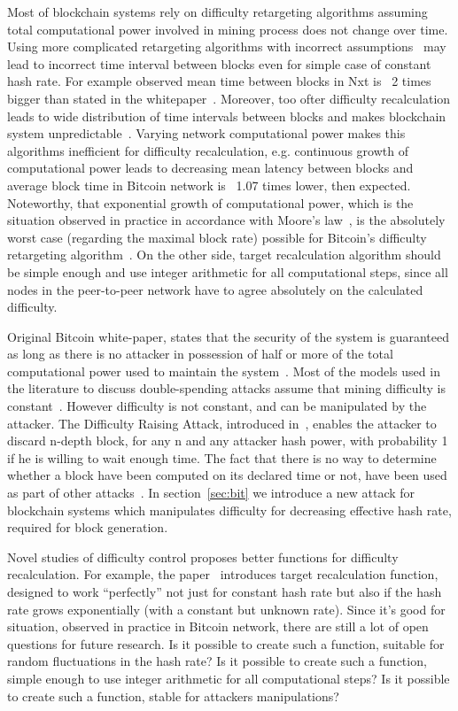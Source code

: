 \documentclass[number,preprint,review]{elsarticle}
\begin{document}
Most of blockchain systems rely on difficulty retargeting algorithms assuming total computational power involved in mining process does not change over time.
Using more complicated retargeting algorithms with incorrect assumptions~\cite{andruiman2014} may lead to incorrect time interval between blocks even for simple case of constant hash rate. For example observed mean time between blocks in Nxt is ~2 times bigger than stated in the whitepaper~\cite{nxt}. Moreover, too ofter difficulty recalculation leads to wide distribution of time intervals between blocks and makes blockchain system unpredictable~\cite{andruiman2014}.
Varying network computational power makes this algorithms inefficient for difficulty recalculation, e.g. continuous growth of computational power leads to decreasing mean latency between blocks and average block time in Bitcoin network is ~1.07 times lower, then expected.
Noteworthy, that exponential growth of computational power, which is the situation observed in practice in accordance with Moore’s law~\cite{moore2006cramming}, is the absolutely worst case (regarding the maximal block rate) possible for Bitcoin’s difficulty retargeting algorithm~\cite{kraft2015difficulty}.
On the other side, target recalculation algorithm should be simple enough and use integer arithmetic for all computational steps, since all nodes in the peer-to-peer network have to agree absolutely on the calculated difficulty.

Original Bitcoin white-paper, states that the security of the system is guaranteed as long as there is no attacker in possession of half or more of the total computational power used to maintain the system~\cite{Nakamoto2008}.
Most of the models used in the literature to discuss double-spending attacks assume that mining difficulty is constant~\cite{??}.
However difficulty is not constant, and can be manipulated by the attacker.
The Difficulty Raising Attack, introduced in~\cite{bahack2013theoretical}, enables the attacker to discard n-depth block, for any n and any attacker hash power, with probability 1 if he is willing to wait enough time.
The fact that there is no way to determine whether a block have been computed on its declared time or not, have been used as part of other attacks~\cite{timejacking2011, artforz2011}.
In section~\ref{sec:bit} we introduce a new attack for blockchain systems which manipulates difficulty for decreasing effective hash rate, required for block generation.

Novel studies of difficulty control proposes better functions for difficulty recalculation.
For example, the paper~\cite{kraft2015difficulty} introduces target recalculation function, designed to work “perfectly” not just for constant hash rate but also if the hash rate grows exponentially (with a constant but unknown rate).
Since it's good for situation, observed in practice in Bitcoin network, there are still a lot of open questions for future research.
Is it possible to create such a function, suitable for random fluctuations in the hash rate?
Is it possible to create such a function, simple enough to use integer arithmetic for all computational steps?
Is it possible to create such a function, stable for attackers manipulations?
\end{document}

